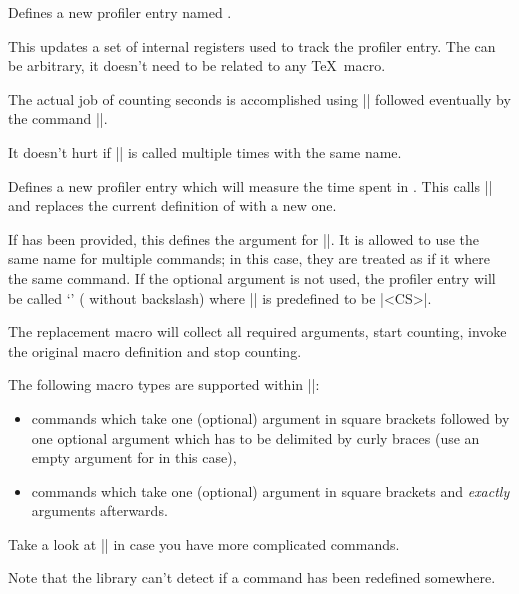 \begin{command}{\pgfprofilenew{}}
	Defines a new profiler entry named .

	This updates a set of internal registers used to track the profiler entry. The  can be arbitrary, it doesn't need to be related to any \TeX\ macro.

	The actual job of counting seconds is accomplished using |\pgfprofilestart| followed eventually by the command |\pgfprofileend|.

	It doesn't hurt if |\pgfprofilenew| is called multiple times with the same name.
\end{command}

\begin{command}{\pgfprofilenewforcommand{}}
	Defines a new profiler entry which will measure the time spent in . This calls |\pgfprofilenew| and replaces the current definition of  with a new one.

	If  has been provided, this defines the argument for |\pgfprofilenew|. It is allowed to use the same name for multiple commands; in this case, they are treated as if it where the same command. If the optional argument is not used, the profiler entry will be called `\declareandlabel{\pgfprofilecs}' ( without backslash) where |\pgfprofilecs| is predefined to be |<CS>|.

	The replacement macro will collect all required arguments, start counting, invoke the original macro definition and stop counting.

	The following macro types are supported within |\pgfprofilenewforcommand|:
	\begin{itemize}
 \item commands which take one (optional) argument in square brackets
   followed by one optional argument which has to be delimited by
   curly braces (use an empty argument for  in this case),
 \item commands which take one (optional) argument in square brackets
   and \emph{exactly}  arguments afterwards.
	\end{itemize}

	Take a look at |\pgfprofilenewforcommandpattern| in case you have more complicated commands.


	Note that the library can't detect if a command has been redefined somewhere.
\end{command}

